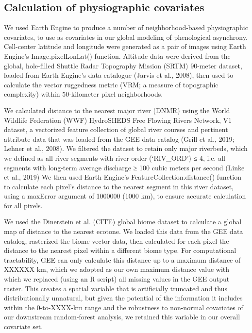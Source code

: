 \documentclass[12pt]{article}
\begin{document}
\subsection*{Calculation of physiographic covariates}
We used Earth Engine to produce a number of neighborhood-based
physiographic covariates, to
use as covariates in our global modeling of phenological asynchrony.
Cell-center latitude and longitude were generated as a pair of images using Earth
Engine’s Image.pixelLonLat() function. Altitude data were derived from
the global, hole-filled Shuttle Radar Topography Mission (SRTM) 90-meter
dataset, loaded from Earth Engine’s data catalogue (Jarvis et al., 2008),
then used to calculate the vector ruggedness metric (VRM; a measure of
topographic complexity) within 50-kilometer pixel neighborhoods.

We calculated distance to the nearest major river (DNMR) using the World
Wildlife Federation (WWF) HydroSHEDS Free Flowing Rivers Network, V1
dataset, a vectorized feature collection of global river courses and
pertinent attribute data that was loaded from the GEE data
catalog (Grill et al., 2019; Lehner et al., 2008). We filtered the
dataset to retain only major riverbeds, which we defined as all river
segments with river order (‘RIV_ORD’) ≤ 4, i.e. all segments with
long-term average discharge ≥ 100 cubic meters per second (Linke et al.,
2019) We then used Earth Engine’s FeatureCollection.distance() function
to calculate each pixel’s distance to the nearest segment in this river
dataset, using a maxError argument of 1000000 (1000 km), to ensure
accurate calculation for all pixels.

We used the Dinerstein et al. (CITE) global biome dataset to
calculate a global map of distance to the nearest ecotone.
We loaded this data from the GEE data catalog, rasterized the biome vector data,
then calculated for each pixel the distance to the nearest pixel within a different
biome type. For computational tractability, GEE can only calculate this distance
up to a maximum distance of XXXXXX km, which we adopted as our own maximum distance value
with which we replaced (using an R script) all missing values in the GEE output raster.
This creates a spatial variable that is artificially truncated and thus distributionally
unnatural, but given the potential of the information it includes within the 0-to-XXXX-km range
and the robustness to non-normal covariates of our downstream random-forest analysis,
we retained this variable in our overall covariate set.
\end{document}
